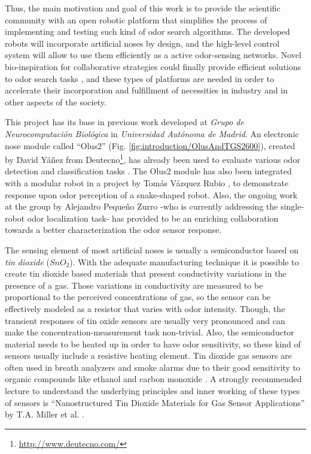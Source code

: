 Thus, the main motivation and goal of this work is to provide the scientific community with an open robotic platform that simplifies the process of implementing and testing such kind of odor search algorithms.
The developed robots will incorporate artificial noses by design, and the high-level control system will allow to use them efficiently as a active odor-sensing networks.
Novel bio-inspiration for collaborative strategies could finally provide efficient solutions to odor search tasks \cite{Mcgill2011, Reynolds2013, Dunbabin2012, raey10, KongcunM09, arleo07}, and these types of platforms are needed in order to accelerate their incorporation and fulfillment of necessities in industry and in other aspects of the society.



This project has its base in previous work developed at \emph{Grupo de Neurocomputaci\'{o}n Biol\'{o}gica} in \emph{Universidad Aut\'{o}noma de Madrid}. An electronic nose module called ``Olus2'' (Fig. \ref{fig:introduction/OlusAndTGS2600}), created by David Y\'{a}\~{n}ez from Deutecno\footnote{\url{http://www.deutecno.com/}}, has already been used to evaluate various odor detection and classification tasks \cite{YanezToledano12, Yanez09}.
The Olus2 module has also been integrated with a modular robot in a project by Tom\'{a}s V\'{a}zquez Rubio \cite{vazquez2013integracion}, to demonstrate response upon odor perception of a snake-shaped robot. Also, the ongoing work at the group by Alejandro Peque\~{n}o Zurro -who is currently addressing the single-robot odor localization task- has provided to be an enriching collaboration towards a better characterization the odor sensor response.

The sensing element of most artificial noses is usually a semiconductor based on \emph{tin dioxide} ($SnO_2$).
With the adequate manufacturing technique it is possible to create tin dioxide based materials that present conductivity variations in the presence of a gas.
Those variations in conductivity are measured to be proportional to the perceived concentrations of gas, so the sensor can be effectively modeled as a resistor that varies with odor intensity. Though, the transient responses of tin oxide sensors are usually very pronounced and can make the concentration-measurement task non-trivial.
Also, the semiconductor material needs to be heated up in order to have odor sensitivity, so these kind of sensors usually include a resistive heating element.
Tin dioxide gas sensors are often used in breath analyzers and smoke alarms due to their good sensitivity to organic compounds like ethanol and carbon monoxide \cite{wilson2009applications, stitzel2011artificial}.
A strongly recommended lecture to understand the underlying principles and inner working of these types of sensors is ``Nanostructured Tin Dioxide Materials for Gas Sensor Applications'' by T.A. Miller et al. \cite{MillerBakrania06nanostructured}.

